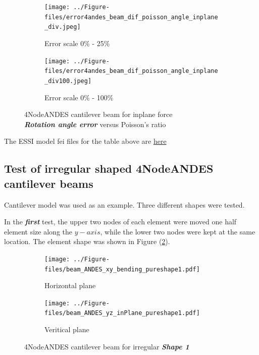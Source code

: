 \documentclass[fleqn,11pt]{article}
\begin{document}
\begin{figure}[H]
  \begin{subfigure}{0.5\textwidth}
    \centering
    \texttt{[image: ../Figure-files/error4andes\_beam\_dif\_poisson\_angle\_inplane\_div.jpeg]}
    \caption{Error scale 0\% - 25\%}
  \end{subfigure}
  \begin{subfigure}{0.5\textwidth}
    \centering
    \texttt{[image: ../Figure-files/error4andes\_beam\_dif\_poisson\_angle\_inplane\_div100.jpeg]}
    \caption{Error scale 0\% - 100\%}
  \end{subfigure}
  \captionsetup{justification=centering,margin=2cm}
  \caption{4NodeANDES cantilever beam for inplane force\\
      \emph{\textbf{Rotation angle error}}   versus   Poisson's ratio}
  \label{table angle error 4NodeANDES cantilever beam for different Poisson ratio 2}
\end{figure}



The ESSI model fei files for the table above are \href{https://github.com/yuan-energy/ESSI_Verification/blob/master/4NodeANDES/cantilever_different_Poisson/cantilever_different_Poisson.tar.gz?raw=true}{here}






\newpage
\subsection{Test of irregular shaped 4NodeANDES cantilever beams}

Cantilever model was used as an example. 
Three different shapes were tested. 


In the \emph{\textbf{first}} test, the upper two nodes of each element were moved one half element size along the $y-axis$, while the lower two nodes were kept at the same location. The element shape was shown in Figure (\ref{fig irregular shape 1 4NodeANDES cantilever beams }).


\begin{figure}[H]
  \centering
    \begin{subfigure}{0.5\textwidth}
      \centering
      \texttt{[image: ../Figure-files/beam\_ANDES\_xy\_bending\_pureshape1.pdf]}
      \caption{Horizontal plane}
    \end{subfigure}
    \begin{subfigure}{0.5\textwidth}
      \centering
      \texttt{[image: ../Figure-files/beam\_ANDES\_yz\_inPlane\_pureshape1.pdf]}
      \caption{Veritical  plane}
    \end{subfigure}
  \caption{4NodeANDES cantilever beam for irregular \textbf{\emph{Shape 1}} }
  \label{fig irregular shape 1 4NodeANDES cantilever beams }
\end{figure}
\end{document}
